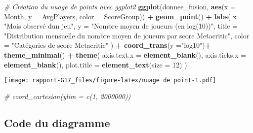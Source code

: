 \documentclass[mstat,12pt]{unswthesis}
\newenvironment{Shaded}{\begin{snugshade}}{\end{snugshade}}
\newcommand{\AttributeTok}[1]{\textcolor[rgb]{0.13,0.29,0.53}{#1}}
\newcommand{\CommentTok}[1]{\textcolor[rgb]{0.56,0.35,0.01}{\textit{#1}}}
\newcommand{\DecValTok}[1]{\textcolor[rgb]{0.00,0.00,0.81}{#1}}
\newcommand{\FunctionTok}[1]{\textcolor[rgb]{0.13,0.29,0.53}{\textbf{#1}}}
\newcommand{\NormalTok}[1]{#1}
\newcommand{\SpecialCharTok}[1]{\textcolor[rgb]{0.81,0.36,0.00}{\textbf{#1}}}
\newcommand{\StringTok}[1]{\textcolor[rgb]{0.31,0.60,0.02}{#1}}
\begin{document}
\begin{Shaded}
\begin{Highlighting}[]
\CommentTok{\# Création du nuage de points avec ggplot2}
\FunctionTok{ggplot}\NormalTok{(donnee\_fusion, }\FunctionTok{aes}\NormalTok{(}\AttributeTok{x =}\NormalTok{ Month, }\AttributeTok{y =}\NormalTok{ AvgPlayers, }\AttributeTok{color =}\NormalTok{ ScoreGroup)) }\SpecialCharTok{+}
  \FunctionTok{geom\_point}\NormalTok{() }\SpecialCharTok{+} 
  \FunctionTok{labs}\NormalTok{(}
    \AttributeTok{x =} \StringTok{"Mois observé d\textquotesingle{}un jeu"}\NormalTok{,}
    \AttributeTok{y =} \StringTok{"Nombre moyen de joueurs (en log(10))"}\NormalTok{,}
    \AttributeTok{title =} \StringTok{"Distribution mensuelle du nombre moyen de joueurs par score Metacritic"}\NormalTok{,}
    \AttributeTok{color =} \StringTok{"Catégories de score Metacritic"}
\NormalTok{  ) }\SpecialCharTok{+} \FunctionTok{coord\_trans}\NormalTok{(}\AttributeTok{y =}\StringTok{"log10"}\NormalTok{)}\SpecialCharTok{+}
  \FunctionTok{theme\_minimal}\NormalTok{() }\SpecialCharTok{+}
  \FunctionTok{theme}\NormalTok{(}
    \AttributeTok{axis.text.x =} \FunctionTok{element\_blank}\NormalTok{(),  }
    \AttributeTok{axis.ticks.x =} \FunctionTok{element\_blank}\NormalTok{(),  }
    \AttributeTok{plot.title =} \FunctionTok{element\_text}\NormalTok{(}\AttributeTok{size =} \DecValTok{12}\NormalTok{)}
\NormalTok{  ) }
\end{Highlighting}
\end{Shaded}

\texttt{[image: rapport-G17\_files/figure-latex/nuage de point-1.pdf]}

\begin{Shaded}
\begin{Highlighting}[]
 \CommentTok{\# coord\_cartesian(ylim = c(1, 2000000))}
\end{Highlighting}
\end{Shaded}

\hypertarget{code-du-diagramme}{%
\subsection*{Code du diagramme}\label{code-du-diagramme}}
\end{document}
